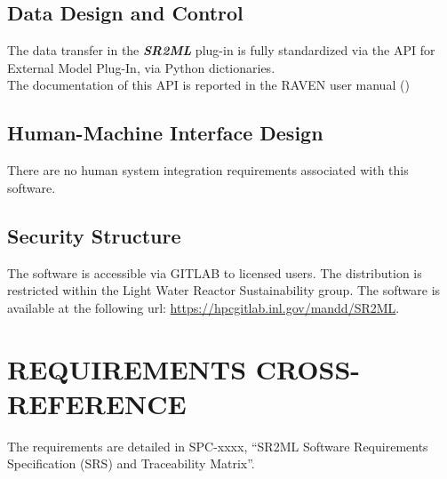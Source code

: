 \subsection{Data Design and Control}
The data transfer in the \textbf{\textit{SR2ML}}  plug-in is fully standardized via the API for External Model Plug-In, via
Python dictionaries.
\\The documentation of this  API is reported in the RAVEN user manual (\cite{RAVENuserManual})

\subsection{Human-Machine Interface Design}
 There are no human system integration requirements associated with this software.

 \subsection{Security Structure}


The software is accessible via GITLAB to licensed users. The distribution is restricted within the Light Water Reactor Sustainability group.
The software is available at the following url: \url{https://hpcgitlab.inl.gov/mandd/SR2ML}.

 \section{REQUIREMENTS CROSS-REFERENCE}
The requirements are detailed in SPC-xxxx, ``SR2ML Software Requirements Specification (SRS) and Traceability Matrix''.
